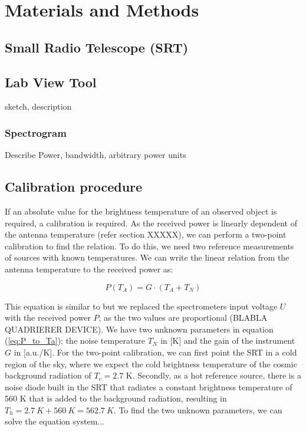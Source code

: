 
\section{Materials and Methods}

\subsection{Small Radio Telescope (SRT)}


\subsection{Lab View Tool}
sketch, description

\subsubsection{Spectrogram}

Describe Power, bandwidth, arbitrary power units


\subsection{Calibration procedure}\label{sec:calib}
If an absolute value for the brightness temperature of an observed object is required, a calibration is required. As the received power is linearly dependent of the antenna temperature (refer section XXXXX), we can perform a two-point calibration to find the relation. To do this, we need two reference measurements of sources with known temperatures. We can write the linear relation from the antenna temperature to the received power as:

\begin{equation} \label{eq:P_to_Ta}
	P(T_A) = G \cdot (T_A + T_N)
\end{equation} 

This equation is similar to \cite[Eq. (5)]{srt} but we replaced the spectrometers input voltage $U$ with the received power $P$, as the two values are proportional (BLABLA QUADRIERER DEVICE). We have two unknown parameters in equation (\ref{eq:P_to_Ta}); the noise temperature $T_N$ in [K] and the gain of the instrument $G$ in [a.u./K]. For the two-point calibration, we can first point the SRT in a cold region of the sky, where we expect the cold brightness temperature of the cosmic background radiation of $T_c=2.7$ K. Secondly, as a hot reference source, there is a noise diode built in the SRT that radiates a constant brightness temperature of 560 K that is added to the background radiation, resulting in $T_h=\SI{2.7}{K}+\SI{560}{K}=\SI{562.7}{K}$. To find the two unknown parameters, we can solve the equation system...


